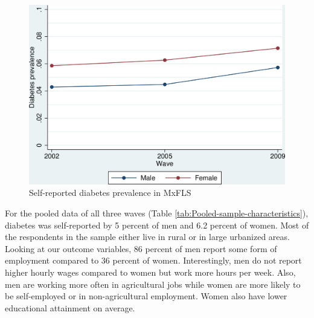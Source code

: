 \documentclass[12pt,english,british]{article}
\begin{document}
\begin{figure}[h!]
\begin{center}
\includegraphics[width=0.7\columnwidth]{figures/diabetes_prevalence1/diabetes_prevalence1}
\end{center}
\caption{\label{fig:Self-reported-diabetes-prevalenc}Self-reported diabetes
prevalence in MxFLS}
\end{figure}

For the pooled data of all three waves (Table  \ref{tab:Pooled-sample-characteristics}),
diabetes was self-reported by 5 percent of men and 6.2 percent of
women. Most of the respondents in the sample either live in rural
or in large urbanized areas. Looking at our outcome variables, 86
percent of men report some form of employment compared to 36 percent
of women. Interestingly, men do not report higher hourly wages compared
to women but work more hours per week. Also, men are working more
often in agricultural jobs while women are more likely to be self-employed
or in non-agricultural employment. Women also have lower educational
attainment on average. 
\end{document}
